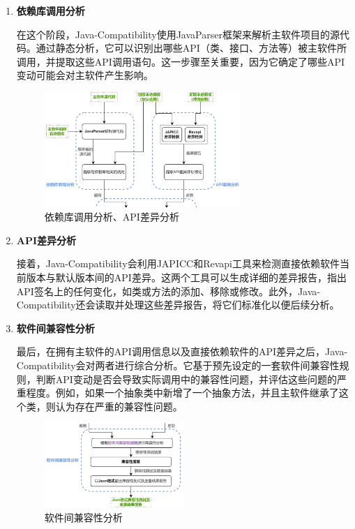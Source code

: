 \documentclass{article}
\begin{document}
\begin{enumerate}
	\item 
	\textbf{依赖库调用分析}
	
	在这个阶段，Java-Compatibility使用JavaParser框架来解析主软件项目的源代码。通过静态分析，它可以识别出哪些API（类、接口、方法等）被主软件所调用，并提取这些API调用语句。这一步骤至关重要，因为它确定了哪些API变动可能会对主软件产生影响。
	
	\begin{figure}[H]
		\centering
		\includegraphics[width=0.7\textwidth]{img/3.png}
		\caption{依赖库调用分析、API差异分析}
	\end{figure}
	
	\item 
	\textbf{API差异分析}
	
	接着，Java-Compatibility会利用JAPICC和Revapi工具来检测直接依赖软件当前版本与默认版本间的API差异。这两个工具可以生成详细的差异报告，指出API签名上的任何变化，如类或方法的添加、移除或修改。此外，Java-Compatibility还会读取并处理这些差异报告，将它们标准化以便后续分析。
	
	\item
	\textbf{软件间兼容性分析}
	
	最后，在拥有主软件的API调用信息以及直接依赖软件的API差异之后，Java-Compatibility会对两者进行综合分析。它基于预先设定的一套软件间兼容性规则，判断API变动是否会导致实际调用中的兼容性问题，并评估这些问题的严重程度。例如，如果一个抽象类中新增了一个抽象方法，并且主软件继承了这个类，则认为存在严重的兼容性问题。
	
	\begin{figure}[H]
		\centering
		\includegraphics[width=0.5\textwidth]{img/4.png}
		\caption{软件间兼容性分析}
	\end{figure}
\end{enumerate}
\end{document}
